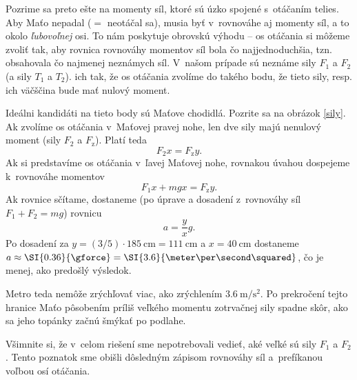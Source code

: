 Pozrime sa preto ešte na momenty síl, ktoré sú úzko spojené s~otáčaním telies.
Aby Maťo nepadal ($=$ neotáčal sa), musia byť v~rovnováhe aj momenty síl,
a to okolo \emph{ľubovoľnej} osi. To nám poskytuje obrovskú výhodu -- os otáčania
si môžeme zvoliť tak, aby rovnica rovnováhy momentov síl bola čo najjednoduchšia, tzn. obsahovala
čo najmenej neznámych síl. V~našom prípade sú neznáme sily $F_1$ a $F_2$ (a sily
$T_1$ a $T_2$).  ich tak, že os otáčania zvolíme do takého bodu, že
tieto sily, resp. ich väčščina bude mať nulový moment.

Ideálni kandidáti na tieto body sú Maťove chodidlá. Pozrite sa na obrázok
\ref{sily}. Ak zvolíme os otáčania v~Maťovej pravej nohe, len dve sily
majú nenulový moment (sily $F_2$ a $F_{\mathrm{z}}$). Platí teda
$$
  F_2 x = F_{\mathrm{z}} y\text{.}
$$
Ak si predstavíme os otáčania v~ľavej Maťovej nohe, rovnakou úvahou dospejeme
k~rovnováhe momentov
$$
  F_1 x + mg x = F_{\mathrm{z}} y\text{.}
$$
Ak rovnice sčítame, dostaneme (po úprave a dosadení z~rovnováhy síl $F_1 + F_2 = mg$)
rovnicu
$$
   a = \frac{y}{x} g\text{.}
$$
Po dosadení za $y = (3/5) \cdot \SI{185}{\cm} = \SI{111}{\cm}$ a $x = \SI{40}{\cm}$
dostaneme $a \approx \SI{0.36}{\gforce} = \SI{3.6}{\meter\per\second\squared}$, čo je menej, ako predošlý výsledok.

Metro teda nemôže zrýchľovať viac, ako zrýchlením $\SI{3.6}{\meter\per\second\squared}$.
Po prekročení tejto hranice Maťo pôsobením príliš veľkého momentu zotrvačnej
sily spadne skôr, ako sa jeho topánky začnú šmýkať po podlahe.

Všimnite si, že v~celom riešení sme nepotrebovali vedieť, aké veľké sú sily
$F_1$ a $F_2$. Tento poznatok sme obišli dôsledným zápisom rovnováhy síl
a~prefíkanou voľbou osí otáčania. 

